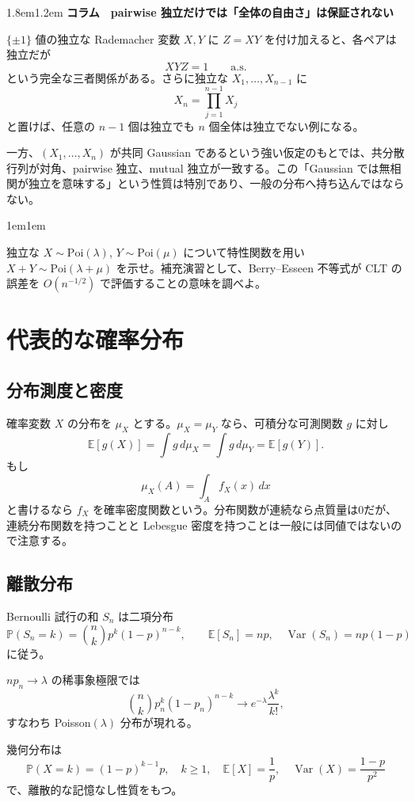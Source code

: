 \documentclass[a4paper,11pt,pdflatex,ja=standard,jafont=ipaex-type1,
  magstyle=real,scale=1]{bxjsarticle}
\theoremstyle{definition}
\theoremstyle{remark}
\newenvironment{columnnote}[1]
{\par\medskip\begin{adjustwidth}{1.8em}{1.2em}\small\sffamily\color{ColumnText}
{\large\bfseries\color{Accent}コラム　#1}\par\vspace{0.25em}{\color{Accent}\hrule height 0.7pt}\vspace{0.65em}}
{\par\vspace{0.45em}{\color{Accent}\hrule height 0.3pt}\end{adjustwidth}\medskip}
\newenvironment{exerciseblock}
{\par\medskip\begin{adjustwidth}{1em}{1em}\small\sffamily{\bfseries\color{SoftGray}演習・補足}\par\vspace{0.2em}}
{\end{adjustwidth}\medskip}
\newcommand{\E}{\mathbb E}
\newcommand{\Pp}{\mathbb P}
\newcommand{\1}{\mathbf 1}
\newcommand{\Var}{\operatorname{Var}}
\begin{document}
\begin{columnnote}{pairwise 独立だけでは「全体の自由さ」は保証されない}
$\{\pm1\}$ 値の独立な Rademacher 変数 $X,Y$ に $Z=XY$ を付け加えると、各ペアは独立だが
\[
XYZ=1\qquad\text{a.s.}
\]
という完全な三者関係がある。さらに独立な $X_1,\dots,X_{n-1}$ に
\[
X_n=\prod_{j=1}^{n-1}X_j
\]
と置けば、任意の $n-1$ 個は独立でも $n$ 個全体は独立でない例になる。

一方、$(X_1,\dots,X_n)$ が共同 Gaussian であるという強い仮定のもとでは、共分散行列が対角、pairwise 独立、mutual 独立が一致する。この「Gaussian では無相関が独立を意味する」という性質は特別であり、一般の分布へ持ち込んではならない。
\end{columnnote}

\begin{exerciseblock}
独立な $X\sim\mathrm{Poi}(\lambda)$, $Y\sim\mathrm{Poi}(\mu)$ について特性関数を用い $X+Y\sim\mathrm{Poi}(\lambda+\mu)$ を示せ。補充演習として、Berry--Esseen 不等式が CLT の誤差を $O(n^{-1/2})$ で評価することの意味を調べよ。
\end{exerciseblock}



\section{代表的な確率分布}
\subsection{分布測度と密度}
確率変数 $X$ の分布を $\mu_X$ とする。$\mu_X=\mu_Y$ なら、可積分な可測関数 $g$ に対し
\[
\E[g(X)]=\int g\,d\mu_X=\int g\,d\mu_Y=\E[g(Y)].
\]
もし
\[
\mu_X(A)=\int_A f_X(x)\,dx
\]
と書けるなら $f_X$ を確率密度関数という。分布関数が連続なら点質量は0だが、連続分布関数を持つことと Lebesgue 密度を持つことは一般には同値ではないので注意する。

\subsection{離散分布}
Bernoulli 試行の和 $S_n$ は二項分布
\[
\Pp(S_n=k)=\binom nk p^k(1-p)^{n-k},\qquad
\E[S_n]=np,
\quad \Var(S_n)=np(1-p)
\]
に従う。

$np_n\to\lambda$ の稀事象極限では
\[
\binom nk p_n^k(1-p_n)^{n-k}\to e^{-\lambda}\frac{\lambda^k}{k!},
\]
すなわち Poisson$(\lambda)$ 分布が現れる。

幾何分布は
\[
\Pp(X=k)=(1-p)^{k-1}p,
\quad k\ge1,
\quad \E[X]=\frac1p,
\quad \Var(X)=\frac{1-p}{p^2}
\]
で、離散的な記憶なし性質をもつ。
\end{document}
